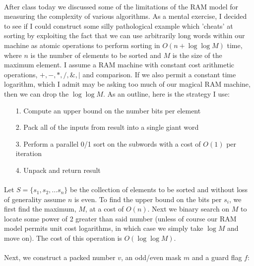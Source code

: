 \documentclass{article}
\begin{document}
\paragraph{} After class today we discussed some of the limitations of the RAM model for measuring the complexity of various algorithms.  As a mental exercise, I decided to see if I could construct some silly pathological example which 'cheats' at sorting by exploiting the fact that we can use arbitrarily long words within our machine as atomic operations to perform sorting in $O(n + \log{\log{M}})$ time, where $n$ is the number of elements to be sorted and $M$ is the size of the maximum element.  I assume a RAM machine with constant cost arithmetic operations, $+,-,*,/,\&,|$ and comparison.  If we also permit a constant time logarithm, which I admit may be asking too much of our magical RAM machine, then we can drop the $\log{\log{M}}$.  As an outline, here is the strategy I use:

\begin{itemize}

\item[1.]  Compute an upper bound on the number bits per element

\item[2.]  Pack all of the inputs from result into a single giant word

\item[3.]  Perform a parallel 0/1 sort on the subwords with a cost of $O(1)$ per iteration

\item[4.]  Unpack and return result

\end{itemize}

\paragraph{} Let $S = \{ s_1, s_2, ... s_n \}$ be the collection of elements to be sorted and without loss of generality assume $n$ is even.  To find the upper bound on the bits per $s_i$, we first find the maximum, $M$, at a cost of $O(n)$.  Next we binary search on $M$ to locate some power of 2 greater than said number (unless of course our RAM model permits unit cost logarithms, in which case we simply take $\log{M}$ and move on).  The cost of this operation is $O(\log{\log{M}})$.

\paragraph{} Next, we construct a packed number $v$, an odd/even mask $m$ and a guard flag $f$:
\end{document}
